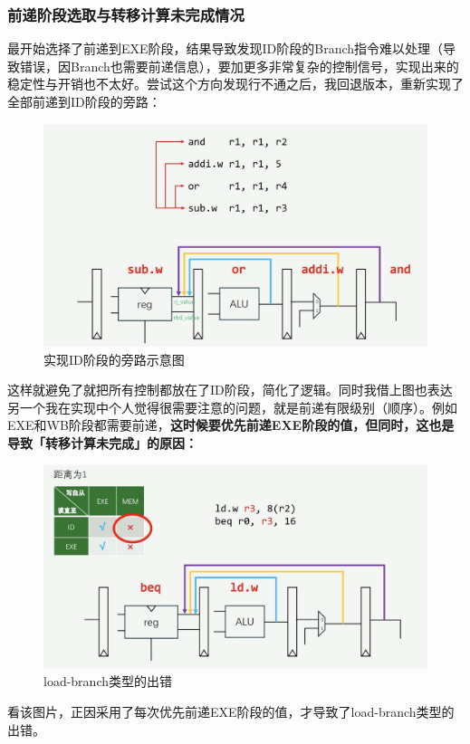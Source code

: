 \documentclass[a4paper]{article}
\begin{document}
\subsubsection{前递阶段选取与转移计算未完成情况}

最开始选择了前递到EXE阶段，结果导致发现ID阶段的Branch指令难以处理（导致错误，因Branch也需要前递信息），要加更多非常复杂的控制信号，实现出来的稳定性与开销也不太好。尝试这个方向发现行不通之后，我回退版本，重新实现了全部前递到ID阶段的旁路：

\begin{figure}[H]
    \centering
    \includegraphics[width=0.8\linewidth]{img/顺序图片/顺序1.png}
    \caption{实现ID阶段的旁路示意图}
\end{figure}

这样就避免了就把所有控制都放在了ID阶段，简化了逻辑。同时我借上图也表达另一个我在实现中个人觉得很需要注意的问题，就是前递有限级别（顺序）。例如EXE和WB阶段都需要前递，\textbf{这时候要优先前递EXE阶段的值，但同时，这也是导致「转移计算未完成」的原因：}


\begin{figure}[H]
    \centering
    \includegraphics[width=0.8\linewidth]{img/顺序图片/需要阻塞情况1.png}
    \caption{load-branch类型的出错}
\end{figure}

看该图片，正因采用了每次优先前递EXE阶段的值，才导致了load-branch类型的出错。
\end{document}
